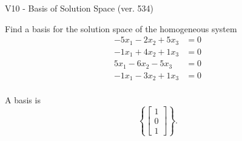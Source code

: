 \begin{exercise}
  \begin{exerciseTitle}V10 - Basis of Solution Space (ver. 534)\end{exerciseTitle}
  \begin{exerciseStatement}
    Find a basis for the solution space of the homogeneous system 
\begin{align*}
 -5 x_ 1 -2 x_ 2 + 5 x_ 3 &= 0  \\ 
  -1 x_ 1 + 4 x_ 2 + 1 x_ 3 &= 0  \\ 
  5 x_ 1 -6 x_ 2 -5 x_ 3 &= 0  \\ 
  -1 x_ 1 -3 x_ 2 + 1 x_ 3 &= 0  \\ 
 \end{align*}


 
  \end{exerciseStatement}

  \begin{exerciseAnswer}
   A basis is   
\[\left\{\left[\begin{array}{c}
1 \\
0 \\
1
\end{array}\right]\right\}.\]

  


  \end{exerciseAnswer}
\end{exercise}